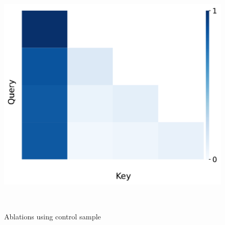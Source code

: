 \begin{figure}[t]
\begin{minipage}{0.33\textwidth}
  \end{minipage}~
  \begin{minipage}{0.33\textwidth}
      \centering
      \label{fig:appendix-ablation-massive-sup-control-attn}
      \vspace{-.2em}
      \includegraphics[width=\linewidth]{Figures/figures_circuit/interventions/bos_control/L0_intervention_attn_weights.pdf}
  \end{minipage}~
  
  \caption{\small Ablations using control sample
  }
  \label{figure:appendix-ablation-massive-sup-control}
\end{figure}

